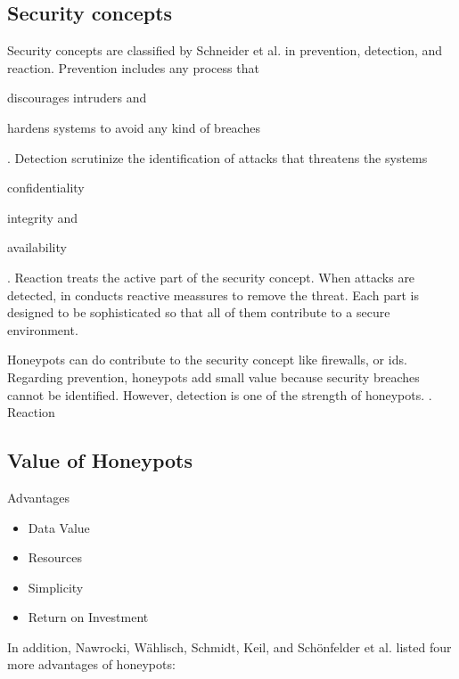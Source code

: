 \subsection{Security concepts}
\label{subsec:honeypot-security-concept}

Security concepts are classified by Schneider et al. \cite{Schneier2004} in prevention, detection, and reaction. Prevention includes any process that
\begin{enumerate*}[label=(\roman*)]
    \item discourages intruders and
    \item hardens systems to avoid any kind of breaches
\end{enumerate*}. Detection scrutinize the identification of attacks that threatens the systems
\begin{enumerate*}[label=(\roman*)]
    \item confidentiality
    \item integrity and
    \item availability
\end{enumerate*}. Reaction treats the active part of the security concept. When attacks are detected, in conducts reactive meassures to remove the threat. Each part is designed to be sophisticated so that all of them contribute to a secure environment. \cite{NawrockiWSKS2016}

Honeypots can do contribute to the security concept like firewalls, or \ac{ids}. Regarding prevention, honeypots add small value because security breaches cannot be identified. However, detection is one of the strength of honeypots. . Reaction \cite{NawrockiWSKS2016}

\subsection{Value of Honeypots}

Advantages

\begin{itemize}
    \item Data Value
    \item Resources
    \item Simplicity
    \item Return on Investment
\end{itemize}

In addition, Nawrocki, Wählisch, Schmidt, Keil, and Schönfelder et al. \cite{NawrockiWSKS2016} listed four more advantages of honeypots:

